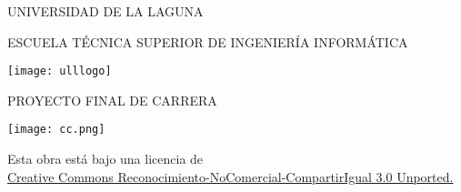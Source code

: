 

\begin{titlepage}
\thispagestyle{empty}
\vspace*{2cm}
\centerline{\large UNIVERSIDAD DE LA LAGUNA}
\vspace{0.3cm}
\centerline{ESCUELA TÉCNICA SUPERIOR DE INGENIERÍA INFORMÁTICA}
\vspace{0.5cm}
\centerline{\texttt{[image: ulllogo]}}
\vspace{0.5cm}
\centerline{\large PROYECTO FINAL DE CARRERA}
\vspace{3.2cm}

\begin{center}
{\huge \bf \titlethesis}

% 
% 


\end{center}

\vspace{5cm}
\begin{flushright}
\begin{minipage}{7cm}
{\bf \authorthesis}
\vspace{0.3cm}

\end{minipage}
\end{flushright}

\newpage
\thispagestyle{empty}
\null
\vfill
\begin{center}
\leavevmode
\texttt{[image: cc.png]}

\label{fig:cc}
\scriptsize{Esta obra está bajo una licencia de \\ \href{http://creativecommons.org/licenses/by-nc-sa/3.0/}{Creative Commons Reconocimiento-NoComercial-CompartirIgual 3.0 Unported.}}
\end{center}

\end{titlepage}
